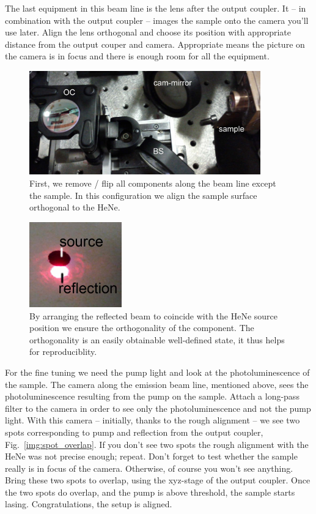 The last equipment
in this beam line
is the lens
after the output coupler.
It -- in combination with the output coupler --
images the sample
onto the camera
you'll use later.
Align the lens orthogonal
and choose its position
with appropriate distance
from the output couper
and camera.
Appropriate means
the picture on the camera is in focus
and there is enough room
for all the equipment.

\begin{figure}
\centering
\includegraphics[width=10cm]{img/cavity_flipped.jpg}
\caption{First, we remove / flip all components along the beam line except the sample.
In this configuration we align the sample surface orthogonal to the HeNe.}
\label{img:cavity_flipped}
\end{figure}

\begin{figure}
\centering
\includegraphics[width=4cm]{img/HeNe.jpg}
\caption{By arranging the reflected beam to coincide with the HeNe source position
we ensure the orthogonality of the component.
The orthogonality is an easily obtainable well-defined state,
it thus helps for reproduciblity.}
\label{img:HeNe}
\end{figure}

For the fine tuning
we need the pump light
and look at the photoluminescence
of the sample.
The camera along the emission beam line,
mentioned above,
sees the photoluminescence
resulting from the pump on the sample.
Attach a long-pass filter
to the camera
in order to see only the photoluminescence
and not the pump light.
With this camera --
initially,
thanks to the rough alignment --
we see two spots corresponding to
pump and reflection from the output coupler,
Fig.~\ref{img:spot_overlap}.
If you don't see two spots
the rough alignment
with the HeNe
was not precise enough;
repeat.
Don't forget to test whether
the sample really is
in focus of the camera.
Otherwise,
of course you won't see anything.
Bring these two spots to overlap,
using the xyz-stage of the output coupler.
Once the two spots do overlap,
and the pump is above threshold,
the sample starts lasing.
Congratulations,
the setup is aligned.

